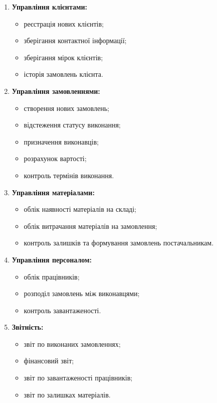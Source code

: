 \documentclass[14pt,a4paper]{extarticle}
\begin{document}
\begin{enumerate}
    \item \textbf{Управління клієнтами:}
    \begin{itemize}
        \item реєстрація нових клієнтів;
        \item зберігання контактної інформації;
        \item зберігання мірок клієнтів;
        \item історія замовлень клієнта.
    \end{itemize}
    
    \item \textbf{Управління замовленнями:}
    \begin{itemize}
        \item створення нових замовлень;
        \item відстеження статусу виконання;
        \item призначення виконавців;
        \item розрахунок вартості;
        \item контроль термінів виконання.
    \end{itemize}
    
    \item \textbf{Управління матеріалами:}
    \begin{itemize}
        \item облік наявності матеріалів на складі;
        \item облік витрачання матеріалів на замовлення;
        \item контроль залишків та формування замовлень постачальникам.
    \end{itemize}
    
    \item \textbf{Управління персоналом:}
    \begin{itemize}
        \item облік працівників;
        \item розподіл замовлень між виконавцями;
        \item контроль завантаженості.
    \end{itemize}
    
    \item \textbf{Звітність:}
    \begin{itemize}
        \item звіт по виконаних замовленнях;
        \item фінансовий звіт;
        \item звіт по завантаженості працівників;
        \item звіт по залишках матеріалів.
    \end{itemize}
\end{enumerate}
\end{document}
